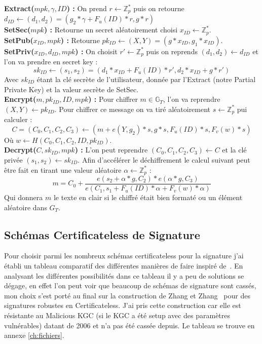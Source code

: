 \textbf{Extract($mpk, \gamma, ID$) :} On prend $r \leftarrow \mathbb{Z}_p^*$ puis on retourne $d_{ID} \leftarrow (d_1, d_2) = (g_2*\gamma + F_u(ID)*r, g*r)$\\
\textbf{SetSec($mpk$) :} Retourne un secret aléatoirement choisi $x_{ID} \leftarrow \mathbb{Z}_p^*$.\\
\textbf{SetPub($x_{ID}, mpk$) :} Retourne $pk_{ID} \leftarrow (X,Y) = (g*x_{ID}, g_1*x_{ID})$.\\
\textbf{SetPriv($x_{ID}, d_{ID}, mpk$) :} On choisit $r' \leftarrow \mathbb{Z}_p^*$ puis on reprends $(d_1, d_2) \leftarrow d_{ID}$ et l'on va prendre en secret key : 
\[sk_{ID} \leftarrow (s_1, s_2) = (d_1*x_{ID} + F_u(ID)*r', d_2*x_{ID} + g*r')\]
Avec $sk_{ID}$ étant la clé secrète de l'utilisateur, donnée par l'Extract (notre Partial Private Key) et la valeur secrète de SetSec.\\
\textbf{Encrypt($m, pk_{ID}, ID, mpk$) :} Pour chiffrer $m \in \mathbb{G}_T$, l'on va reprendre $(X,Y) \leftarrow pk_{ID}$. Pour chiffrer ce message on va tiré aléatoirement $s \leftarrow \mathbb{Z}_p^*$ pui calculer : 
\[C = (C_0, C_1, C_2, C_3) \leftarrow (m + e(Y, g_2)*s, g*s,F_u(ID)*s, F_v(w)*s )\]
Où $w \leftarrow H(C_0,C_1, C_2, ID, pk_{ID})$.\\
\textbf{Decrypt($C, sk_{ID}, mpk$) :} L'on peut reprendre $(C_0,C_1,C_2,C_3) \leftarrow C$ et la clé privée $(s_1, s_2) \leftarrow sk_{ID}$. Afin d'accélérer le déchiffrement le calcul suivant peut être fait en tirant une valeur aléatoire $\alpha \leftarrow \mathbb{Z}_p^*$ :
\[m = C_0 + \frac{e(s_2 + \alpha*g, C_2 )*e(\alpha*g, C_3)}{e(C_1, s_1 + F_u(ID)*\alpha + F_v(w)*\alpha)}\]
Qui donnera $m$ le texte en clair si le chiffré était bien formaté ou un élément aléatoire dans $G_T$.
\subsection{Schémas Certificateless de Signature}
Pour choisir parmi les nombreux schémas certificateless pour la signature j'ai établi un tableau comparatif des différentes manières de faire inspiré de~\cite{bookIntroCertificateless}. En analysant les différentes possibilités dans ce tableau il y a peu de solutions se dégage, en effet l'on peut voir que beaucoup de schémas de signature sont cassés, mon choix s'est porté au final sur la construction de Zhang et Zhang~\cite{DBLP:conf/acns/ZhangWXF06} pour des signatures robustes en Certificateless. J'ai pris cette construction car elle est résistante au Malicious KGC (si le KGC a été setup avec des paramètres vulnérables) datant de 2006 et n'a pas été cassée depuis. Le tableau se trouve en annexe \ref{ch:fichiers}.
